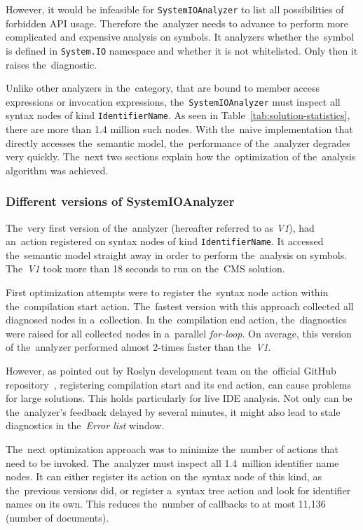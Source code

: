 \documentclass[
  digital, %
  table,   %
  lof,     %
  lot,     %
  oneside,
]{fithesis3}
\begin{document}
However, it would be infeasible for \texttt{SystemIOAnalyzer} to list all possibilities of forbidden API usage. Therefore the~analyzer needs to advance to perform more complicated and expensive analysis on symbols. It analyzers whether the~symbol is defined in \texttt{System.IO} namespace and whether it is not whitelisted. Only then it raises the~diagnostic.

Unlike other analyzers in the~category, that are bound to member access expressions or invocation expressions, the~\texttt{SystemIOAnalyzer} must inspect all syntax nodes of kind \texttt{IdentifierName}. As seen in Table~\ref{tab:solution-statistics}, there are more than 1.4 million such nodes. With the~naive implementation that directly accesses the~semantic model, the~performance of the~analyzer degrades very quickly. The~next two sections explain how the~optimization of the~analysis algorithm was achieved.

\subsubsection{\textbf{Different versions of SystemIOAnalyzer}}
The~very first version of the~analyzer (hereafter referred to as \textit{V1}), had an~action registered on syntax nodes of kind \texttt{IdentifierName}. It accessed the~semantic model straight away in order to perform the~analysis on symbols. The~\textit{V1} took more than 18 seconds to run on the~CMS solution.

First optimization attempts were to register the~syntax node action within the~compilation start action. The~fastest version with this approach collected all diagnosed nodes in a~collection. In the~compilation end action, the~diagnostics were raised for all collected nodes in a~parallel \textit{for-loop}. On average, this version of the~analyzer performed almost 2-times faster than the~\textit{V1}.

However, as pointed out by Roslyn development team on the~official GitHub repository~\cite{compilation-end-action-1, compilation-end-action-2}, registering compilation start and its end action, can cause problems for large solutions. This holds particularly for live IDE analysis. Not only can be the~analyzer's feedback delayed by several minutes, it might also lead to stale diagnostics in the~\textit{Error list} window.

The~next optimization approach was to minimize the~number of actions that need to be invoked. The~analyzer must inspect all 1.4~million identifier name nodes. It can either register its action on the~syntax node of this kind, as the~previous versions did, or register a~syntax tree action and look for identifier names on its own. This reduces the~number of callbacks to at most 11,136 (number of documents). 
\end{document}

